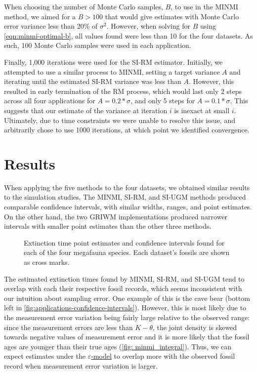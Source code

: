When choosing the number of Monte Carlo samples, $B$, to use in the MINMI method, we aimed for a $B > 100$ that would give estimates with Monte Carlo error variance less than 20\% of $\sigma^2$. However, when solving for $B$ using \autoref{eqn:minmi-optimal-b}, all values found were less than 10 for the four datasets. As such, 100 Monte Carlo samples were used in each application.

Finally, 1{\small,}000 iterations were used for the SI-RM estimator. Initially, we attempted to use a similar process to MINMI, setting a target variance $A$ and iterating until the estimated SI-RM variance was less than $A$. However, this resulted in early termination of the RM process, which would last only 2 steps across all four applications for $A  = 0.2*\sigma$, and only 5 steps for $A = 0.1*\sigma$. This suggests that our estimate of the variance at iteration $i$ is inexact at small $i$. Ultimately, due to time constraints we were unable to resolve this issue, and arbitrarily chose to use 1000 iterations, at which point we identified convergence.

\section{Results}

When applying the five methods to the four datasets, we obtained similar results to the simulation studies. The MINMI, SI-RM, and SI-UGM methods produced comparable confidence intervals, with similar widths, ranges, and point estimates. On the other hand, the two GRIWM implementations produced narrower intervals with smaller point estimates than the other three methods.
\begin{figure}[ht]
    \centering
    
    \caption{Extinction time point estimates and confidence intervals found for each of the four megafauna species. Each dataset's fossils are shown as cross marks.}
    \label{fig:applications-confidence-intervals}
\end{figure}

The estimated extinction times found by MINMI, SI-RM, and SI-UGM tend to overlap with each their respective fossil records, which seems inconsistent with our intuition about sampling error. One example of this is the cave bear (bottom left in \autoref{fig:applications-confidence-intervals}). However, this is most likely due to the measurement error variation being fairly large relative to the observed range: since the measurement errors are less than $K-\theta$, the joint density is skewed towards negative values of measurement error and it is more likely that the fossil ages are younger than their true ages (\autoref{fig: minmi_integral}). Thus, we can expect estimates under the \hyperref[model: measurement-error]{$\varepsilon$-model} to overlap more with the observed fossil record when measurement error variation is larger.

